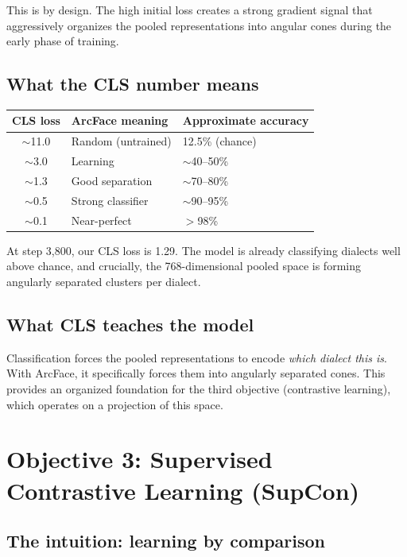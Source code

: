 \documentclass[11pt,a4paper]{article}
\theoremstyle{definition}
\begin{document}
This is by design. The high initial loss creates a strong gradient
signal that aggressively organizes the pooled representations into
angular cones during the early phase of training.

\subsection{What the CLS number means}

\begin{center}
\begin{tabular}{cll}
\toprule
\textbf{CLS loss} & \textbf{ArcFace meaning} & \textbf{Approximate accuracy} \\
\midrule
$\sim$11.0 & Random (untrained) & 12.5\% (chance) \\
$\sim$3.0 & Learning & $\sim$40--50\% \\
$\sim$1.3 & Good separation & $\sim$70--80\% \\
$\sim$0.5 & Strong classifier & $\sim$90--95\% \\
$\sim$0.1 & Near-perfect & $>$98\% \\
\bottomrule
\end{tabular}
\end{center}

At step 3,800, our CLS loss is 1.29. The model is already
classifying dialects well above chance, and crucially, the
768-dimensional pooled space is forming angularly separated clusters
per dialect.

\subsection{What CLS teaches the model}

Classification forces the pooled representations to encode
\emph{which dialect this is}. With ArcFace, it specifically forces
them into angularly separated cones. This provides an organized
foundation for the third objective (contrastive learning), which
operates on a projection of this space.

\section{Objective 3: Supervised Contrastive Learning (SupCon)}
\label{sec:contrastive}

\subsection{The intuition: learning by comparison}
\end{document}
